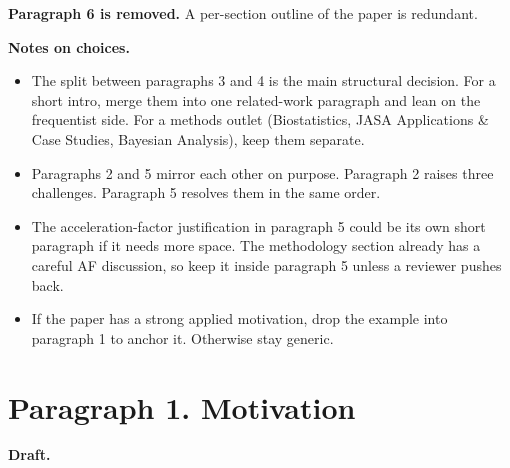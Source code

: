 \textbf{Paragraph 6 is removed.} A per-section outline of the paper is redundant.

\textbf{Notes on choices.}
\begin{itemize}
  \item The split between paragraphs 3 and 4 is the main structural decision.
        For a short intro, merge them into one related-work paragraph and lean on the frequentist side.
        For a methods outlet (Biostatistics, JASA Applications \& Case Studies, Bayesian Analysis), keep them separate.
  \item Paragraphs 2 and 5 mirror each other on purpose.
        Paragraph 2 raises three challenges.
        Paragraph 5 resolves them in the same order.
  \item The acceleration-factor justification in paragraph 5 could be its own short paragraph if it needs more space.
        The methodology section already has a careful AF discussion, so keep it inside paragraph 5 unless a reviewer pushes back.
  \item If the paper has a strong applied motivation, drop the example into paragraph 1 to anchor it.
        Otherwise stay generic.
\end{itemize}


\section*{Paragraph 1. Motivation}

\textbf{Draft.}

